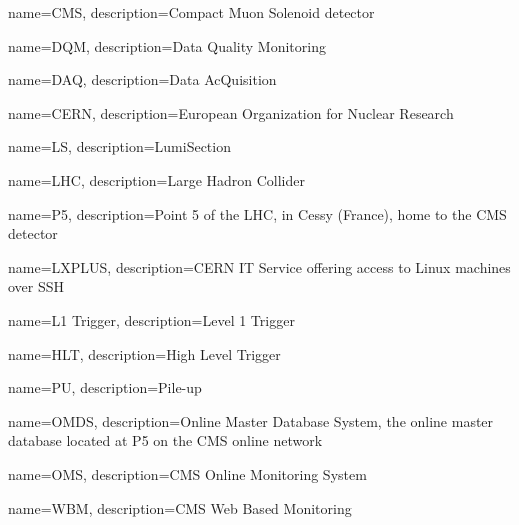 {
    name=CMS,
    description={Compact Muon Solenoid detector}
}

{
    name=DQM,
    description={Data Quality Monitoring}
}

{
    name=DAQ,
    description={Data AcQuisition}
}

{
    name=CERN,
    description={European Organization for Nuclear Research}
}

{
    name=LS,
    description={LumiSection}
}

{
    name=LHC,
    description={Large Hadron Collider}
}


{
    name=P5,
    description={Point 5 of the LHC, in Cessy (France), home to the CMS detector}
}

{
    name=LXPLUS,
    description={CERN IT Service offering access to Linux machines over SSH}
}

{
    name=L1 Trigger,
    description={Level 1 Trigger}
}

{
    name=HLT,
    description={High Level Trigger}
}

{
    name=PU,
    description={Pile-up}
}

{
    name=OMDS,
    description={Online Master Database System, the online master database located at P5 on the CMS online network}
}

{
    name=OMS,
    description={CMS Online Monitoring System}
}

{
    name=WBM,
    description={CMS Web Based Monitoring}
}



